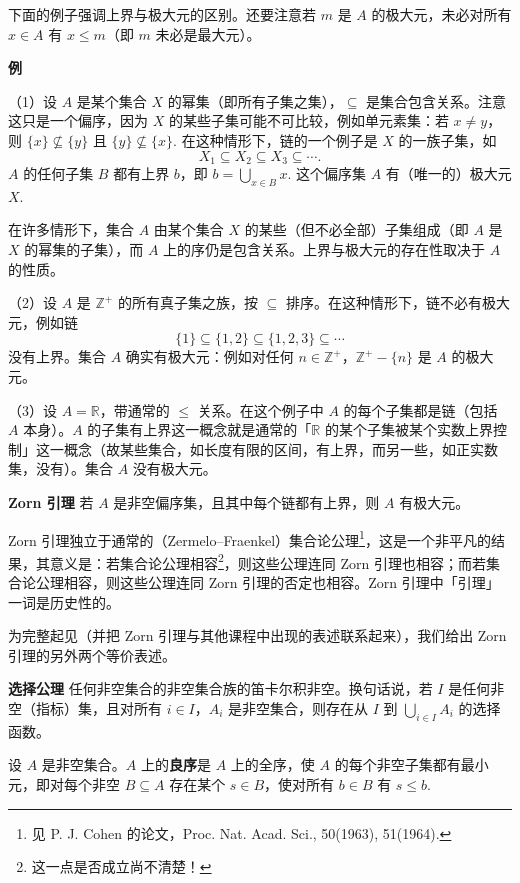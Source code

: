 下面的例子强调上界与极大元的区别。还要注意若 \(m\) 是 \(A\) 的极大元，未必对所有 \(x \in A\) 有 \(x \leq m\)（即 \(m\) 未必是最大元）。

\noindent\textbf{例}

（1）设 \(A\) 是某个集合 \(X\) 的幂集（即所有子集之集），\(\subseteq\) 是集合包含关系。注意这只是一个偏序，因为 \(X\) 的某些子集可能不可比较，例如单元素集：若 \(x \neq y\)，则 \(\{x\} \not\subseteq \{y\}\) 且 \(\{y\} \not\subseteq \{x\}\). 在这种情形下，链的一个例子是 \(X\) 的一族子集，如
\[
X_1 \subseteq X_2 \subseteq X_3 \subseteq \cdots.
\]
\(A\) 的任何子集 \(B\) 都有上界 \(b\)，即 \(b = \bigcup_{x \in B}x\). 这个偏序集 \(A\) 有（唯一的）极大元 \(X\).

在许多情形下，集合 \(A\) 由某个集合 \(X\) 的某些（但不必全部）子集组成（即 \(A\) 是 \(X\) 的幂集的子集），而 \(A\) 上的序仍是包含关系。上界与极大元的存在性取决于 \(A\) 的性质。

（2）设 \(A\) 是 \(\mathbb{Z}^+\) 的所有真子集之族，按 \(\subseteq\) 排序。在这种情形下，链不必有极大元，例如链
\[
\{1\} \subseteq \{1, 2\} \subseteq \{1, 2, 3\} \subseteq \cdots
\]
没有上界。集合 \(A\) 确实有极大元：例如对任何 \(n \in \mathbb{Z}^+\)，\(\mathbb{Z}^+-\{n\}\) 是 \(A\) 的极大元。

（3）设 \(A = \mathbb{R}\)，带通常的 \(\leq\) 关系。在这个例子中 \(A\) 的每个子集都是链（包括 \(A\) 本身）。\(A\) 的子集有上界这一概念就是通常的「\(\mathbb{R}\) 的某个子集被某个实数上界控制」这一概念（故某些集合，如长度有限的区间，有上界，而另一些，如正实数集，没有）。集合 \(A\) 没有极大元。

\noindent\textbf{Zorn 引理} 若 \(A\) 是非空偏序集，且其中每个链都有上界，则 \(A\) 有极大元。

Zorn 引理独立于通常的（Zermelo--Fraenkel）集合论公理\footnote{见 P. J. Cohen 的论文，Proc. Nat. Acad. Sci., 50(1963), 51(1964).}，这是一个非平凡的结果，其意义是：若集合论公理相容\footnote{这一点是否成立尚不清楚！}，则这些公理连同 Zorn 引理也相容；而若集合论公理相容，则这些公理连同 Zorn 引理的否定也相容。Zorn 引理中「引理」一词是历史性的。

为完整起见（并把 Zorn 引理与其他课程中出现的表述联系起来），我们给出 Zorn 引理的另外两个等价表述。

\noindent\textbf{选择公理} 任何非空集合的非空集合族的笛卡尔积非空。换句话说，若 \(I\) 是任何非空（指标）集，且对所有 \(i \in I\)，\(A_i\) 是非空集合，则存在从 \(I\) 到 \(\bigcup_{i \in I}A_i\) 的选择函数。

\begin{definition}
设 \(A\) 是非空集合。\(A\) 上的\textbf{良序}是 \(A\) 上的全序，使 \(A\) 的每个非空子集都有最小元，即对每个非空 \(B \subseteq A\) 存在某个 \(s \in B\)，使对所有 \(b \in B\) 有 \(s \leq b\).
\end{definition}

